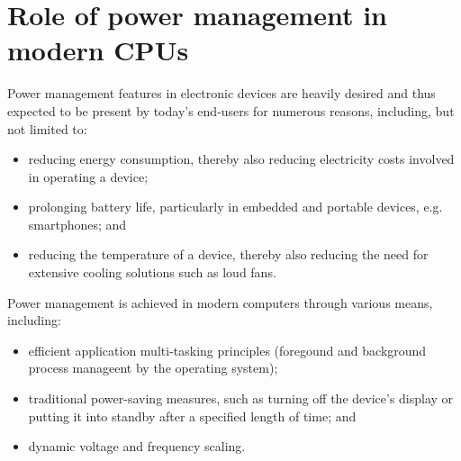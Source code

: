\section{Role of power management in modern CPUs}

Power management features in electronic devices are heavily desired and thus
expected to be present by today's end-users for numerous reasons, including,
but not limited to:
\begin{itemize}
    \item reducing energy consumption, thereby also reducing electricity costs
        involved in operating a device;
    \item prolonging battery life, particularly in embedded and portable
        devices, e.g. smartphones; and
    \item reducing the temperature of a device, thereby also reducing the need
        for extensive cooling solutions such as loud fans.
\end{itemize}

Power management is achieved in modern computers through various means,
including:
\begin{itemize}
    \item efficient application multi-tasking principles (foregound and
        background process manageent by the operating system);
    \item traditional power-saving measures, such as turning off the device's
        display or putting it into standby after a specified length of time; and
    \item dynamic voltage and frequency scaling.
\end{itemize}

